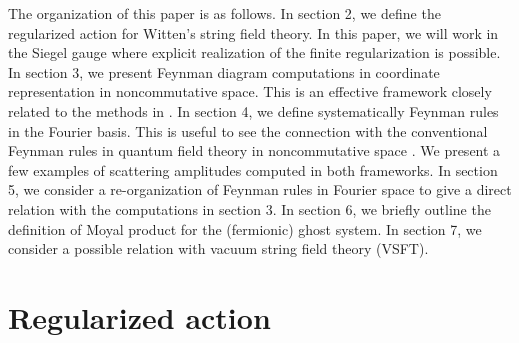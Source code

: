 \documentclass[a4paper,11pt]{article}
\begin{document}
The organization of this paper is as follows. In section 2, we define the
regularized action for Witten's string field theory. In this paper, we will
work in the Siegel gauge where explicit realization of the finite \coordHE{}
regularization is possible. In section 3, we present Feynman diagram
computations in coordinate representation in noncommutative space. This is
an effective framework closely related to the methods in \cite{BM2}. In
section 4, we define systematically Feynman rules in the Fourier basis. This
is useful to see the connection with the conventional Feynman rules in
quantum field theory in noncommutative space \cite{Noncomm}. We present a
few examples of scattering amplitudes computed in both frameworks. In
section 5, we consider a re-organization of Feynman rules in Fourier space
to give a direct relation with the computations in section 3. In section 6,
we briefly outline the definition of Moyal product for the (fermionic) ghost
system. In section 7, we consider a possible relation with vacuum string
field theory (VSFT).

\section{Regularized action}
\end{document}
